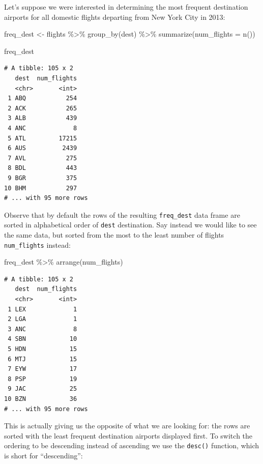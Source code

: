 \documentclass[
  letterpaper,
  DIV=11,
  numbers=noendperiod]{scrreprt}
\newenvironment{Shaded}{\begin{snugshade}}{\end{snugshade}}
\newcommand{\AttributeTok}[1]{\textcolor[rgb]{0.40,0.45,0.13}{#1}}
\newcommand{\FunctionTok}[1]{\textcolor[rgb]{0.28,0.35,0.67}{#1}}
\newcommand{\NormalTok}[1]{\textcolor[rgb]{0.00,0.23,0.31}{#1}}
\newcommand{\OtherTok}[1]{\textcolor[rgb]{0.00,0.23,0.31}{#1}}
\newcommand{\SpecialCharTok}[1]{\textcolor[rgb]{0.37,0.37,0.37}{#1}}
\theoremstyle{definition}
\theoremstyle{remark}
\begin{document}
Let's suppose we were interested in determining the most frequent
destination airports for all domestic flights departing from New York
City in 2013:

\begin{Shaded}
\begin{Highlighting}[]
\NormalTok{freq\_dest }\OtherTok{\textless{}{-}}\NormalTok{ flights }\SpecialCharTok{\%\textgreater{}\%} 
  \FunctionTok{group\_by}\NormalTok{(dest) }\SpecialCharTok{\%\textgreater{}\%} 
  \FunctionTok{summarize}\NormalTok{(}\AttributeTok{num\_flights =} \FunctionTok{n}\NormalTok{())}

\NormalTok{freq\_dest}
\end{Highlighting}
\end{Shaded}

\begin{verbatim}
# A tibble: 105 x 2
   dest  num_flights
   <chr>       <int>
 1 ABQ           254
 2 ACK           265
 3 ALB           439
 4 ANC             8
 5 ATL         17215
 6 AUS          2439
 7 AVL           275
 8 BDL           443
 9 BGR           375
10 BHM           297
# ... with 95 more rows
\end{verbatim}

Observe that by default the rows of the resulting \texttt{freq\_dest}
data frame are sorted in alphabetical order of \texttt{dest}
destination. Say instead we would like to see the same data, but sorted
from the most to the least number of flights \texttt{num\_flights}
instead:

\begin{Shaded}
\begin{Highlighting}[]
\NormalTok{freq\_dest }\SpecialCharTok{\%\textgreater{}\%} 
  \FunctionTok{arrange}\NormalTok{(num\_flights)}
\end{Highlighting}
\end{Shaded}

\begin{verbatim}
# A tibble: 105 x 2
   dest  num_flights
   <chr>       <int>
 1 LEX             1
 2 LGA             1
 3 ANC             8
 4 SBN            10
 5 HDN            15
 6 MTJ            15
 7 EYW            17
 8 PSP            19
 9 JAC            25
10 BZN            36
# ... with 95 more rows
\end{verbatim}

This is actually giving us the opposite of what we are looking for: the
rows are sorted with the least frequent destination airports displayed
first. To switch the ordering to be descending instead of ascending we
use the \texttt{desc()} function, which is short for ``descending'':
\end{document}
